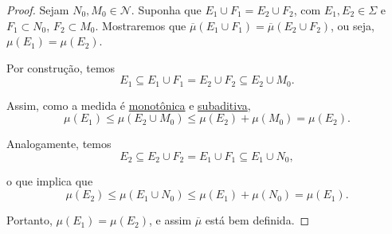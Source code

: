 \begin{proof}
    Sejam $N_0,M_0\in\mathcal{N}$. Suponha que $E_1 \cup F_1 = E_2 \cup F_2$, com $E_1, E_2 \in \Sigma$ e $F_1\subset N_0$, $F_2\subset M_0$. Mostraremos que $\overline{\mu}(E_1 \cup F_1) = \overline{\mu}(E_2 \cup F_2)$, ou seja, $\mu(E_1) = \mu(E_2)$.

    Por construção, temos
    \begin{equation*}
        E_1 \subseteq E_1 \cup F_1 = E_2 \cup F_2 \subseteq E_2 \cup M_0.
    \end{equation*}

    Assim, como a medida é \hyperref[prop:measure_is_monotonic]{monotônica} e \hyperref[prop:measure_is_subadditive]{subaditiva},
    \begin{equation*}
        \mu(E_1) \leq \mu(E_2 \cup M_0) \leq \mu(E_2) + \mu(M_0) = \mu(E_2).
    \end{equation*}

    Analogamente, temos 
    \begin{equation*}
        E_2 \subseteq E_2 \cup F_2 = E_1 \cup F_1 \subseteq E_1 \cup N_0,
    \end{equation*}
    
    o que implica que
    \begin{equation*}
        \mu(E_2) \leq \mu(E_1 \cup N_0) \leq \mu(E_1) + \mu(N_0) = \mu(E_1).
    \end{equation*}

    Portanto, $\mu(E_1) = \mu(E_2)$, e assim $\overline{\mu}$ está bem definida.
\end{proof}
